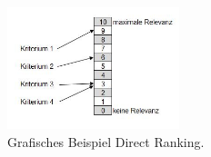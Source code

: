 \begin{figure}[htb]
	\centering
	\includegraphics[width=5cm]{graphics/Direct_Ranking_Methode.JPG}
	\caption[Grafisches Beispiel Direct Ranking]{Grafisches Beispiel Direct Ranking. \footnotemark}
	\label{abb:DirectRanking}
\end{figure}


